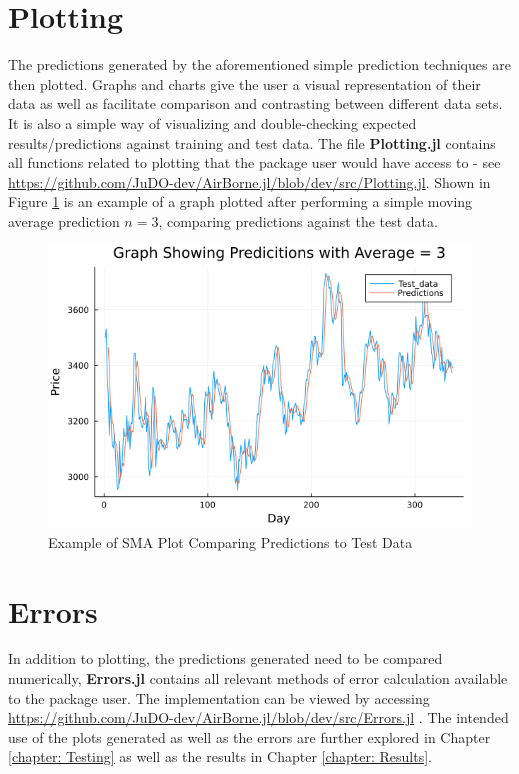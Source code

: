 \section{Plotting}
The predictions generated by the aforementioned simple prediction techniques are then plotted.
Graphs and charts give the user a visual representation of their data as well as facilitate comparison and contrasting between different data sets. It is also a simple way of visualizing and double-checking expected results/predictions against training and test data. The file \textbf{Plotting.jl} contains all functions related to plotting that the package user would have access to - see \hyperlink{}{https://github.com/JuDO-dev/AirBorne.jl/blob/dev/src/Plotting.jl}. Shown in Figure \ref{fig:plot_example} is an example of a graph plotted after performing a simple moving average prediction $n = 3$, comparing predictions against the test data.

\begin{figure}
    \centering
    \includegraphics[width=1\columnwidth]{Implementation/Moving_Avgs_Test_data_3.png}
    \caption{Example of SMA Plot Comparing Predictions to Test Data}
    \label{fig:plot_example}
\end{figure}

\section{Errors}
In addition to plotting, the predictions generated need to be compared numerically, \textbf{Errors.jl} contains all relevant methods of error calculation available to the package user. The implementation can be viewed by accessing  \hyperlink{label}{https://github.com/JuDO-dev/AirBorne.jl/blob/dev/src/Errors.jl}
. The intended use of the plots generated as well as the errors are further explored in Chapter \ref{chapter: Testing} as well as the results in Chapter \ref{chapter: Results}.

